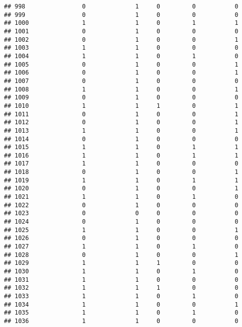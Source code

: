 \documentclass[]{article}
\begin{document}
\begin{verbatim}
## 998                0              1     0         0           0
## 999                0              1     0         0           0
## 1000               1              1     0         1           1
## 1001               0              1     0         0           0
## 1002               0              1     0         0           1
## 1003               1              1     0         0           0
## 1004               1              1     0         1           0
## 1005               0              1     0         0           1
## 1006               0              1     0         0           1
## 1007               0              1     0         0           0
## 1008               1              1     0         0           1
## 1009               0              1     0         0           0
## 1010               1              1     1         0           1
## 1011               0              1     0         0           1
## 1012               0              1     0         0           1
## 1013               1              1     0         0           1
## 1014               0              1     0         0           0
## 1015               1              1     0         1           1
## 1016               1              1     0         1           1
## 1017               1              1     0         0           0
## 1018               0              1     0         0           1
## 1019               1              1     0         1           1
## 1020               0              1     0         0           1
## 1021               1              1     0         1           0
## 1022               0              1     0         0           0
## 1023               0              0     0         0           0
## 1024               0              1     0         0           0
## 1025               1              1     0         0           1
## 1026               0              1     0         0           0
## 1027               1              1     0         1           0
## 1028               0              1     0         0           1
## 1029               1              1     1         0           0
## 1030               1              1     0         1           0
## 1031               1              1     0         0           0
## 1032               1              1     1         0           0
## 1033               1              1     0         1           0
## 1034               1              1     0         0           1
## 1035               1              1     0         1           0
## 1036               1              1     0         0           0

\end{verbatim}
\end{document}
